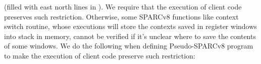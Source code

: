 (filled with east north lines  
in \Fig{\ref{fig:Abstraction of Register Windows and Memory}}). 
We require that the execution of client code 
preserves such restriction. Otherwise, some SPARCv8 
functions like context switch routine, whose 
executions will store the contexts saved in 
register windows into stack in memory, cannot be 
verified if it's unclear where to save the 
contents of some windows. 
We do the following when defining 
Pseudo-SPARCv8 program to make the execution 
of client code preserve such restriction: 


